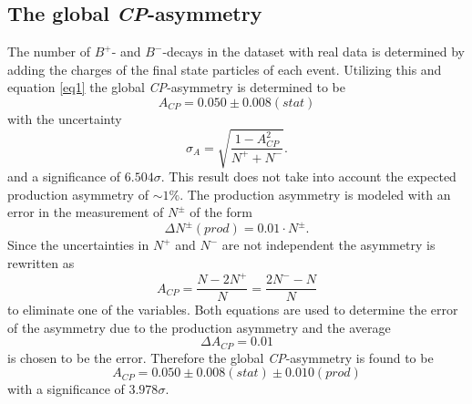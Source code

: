 \subsection{The global \textit{CP}-asymmetry}
The number of $B^+$- and $B^-$-decays in the dataset with real data is determined by adding the charges of the final state 
particles of each event. Utilizing this and equation \eqref{eq1} the global \textit{CP}-asymmetry is determined to be 
\begin{equation}
  A_\textit{CP} = 0.050 \pm 0.008 (stat)
\end{equation}
with the uncertainty 
\begin{equation}
  \sigma_A = \sqrt{\frac{1-A_\textit{CP}^2}{N^+ + N^-}}.
\end{equation}
and a significance of $6.504 \sigma$. This result does not take into account the expected production asymmetry of $\sim 1\%$. 
The production asymmetry is modeled with an error in the measurement of $N^\pm$ of the form 
\begin{equation}
  \Delta N^\pm (prod) = 0.01 \cdot N^\pm . 
\end{equation}
Since the uncertainties in $N^+$ and $N^-$ are not independent the asymmetry is rewritten as
\begin{equation}
  A_\textit{CP} = \frac{N- 2 N^+}{N} = \frac{2 N^- - N}{N}
\end{equation}
to eliminate one of the variables. Both equations are used to determine the error of the asymmetry due to the production 
asymmetry and the average 
\begin{equation}
  \Delta A_\textit{CP} = 0.01 
\end{equation}
is chosen to be the error.
Therefore the global \textit{CP}-asymmetry is found to be 
\begin{equation}
  A_\textit{CP} = 0.050 \pm 0.008 (stat) \pm 0.010 (prod)
\end{equation}
with a significance of $3.978\sigma$.




